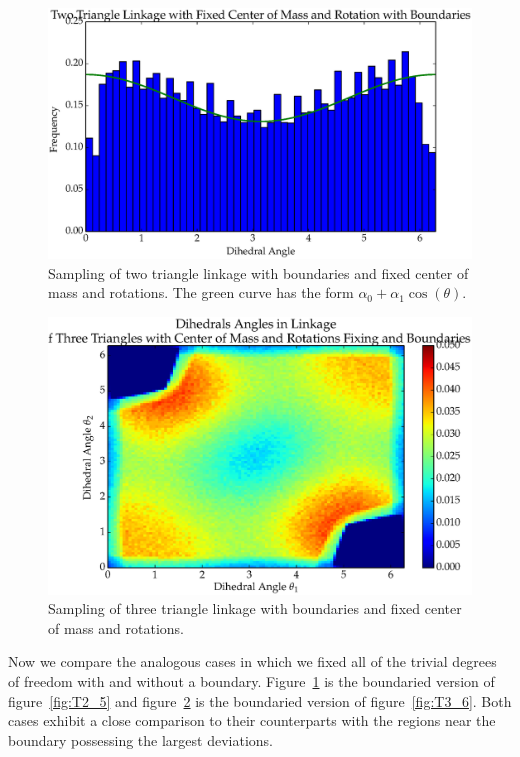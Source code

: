 \begin{figure}[ht]
\centering
  \includegraphics[scale=0.6]{images/T2_6.eps}
\caption{Sampling of two triangle linkage with boundaries and fixed center of mass and rotations. The green curve has the form $\alpha_0 + \alpha_1\cos(\theta)$.}
\label{fig:T2_6}
\end{figure}

\begin{figure}[ht]
\centering
  \includegraphics[scale=0.6]{images/T3_7_2D.eps}
\caption{Sampling of three triangle linkage with boundaries and fixed center of mass and rotations.}
\label{fig:T3_7}
\end{figure}


Now we compare the analogous cases in which we fixed all of the trivial degrees of freedom with and without a boundary. Figure~\ref{fig:T2_6} is the boundaried version of figure~\ref{fig:T2_5} and figure~\ref{fig:T3_7} is the boundaried version of figure~\ref{fig:T3_6}. Both cases exhibit a close comparison to their counterparts with the regions near the boundary possessing the largest deviations. 

